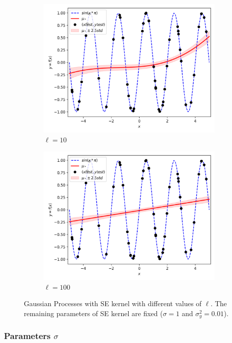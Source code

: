 \documentclass{article}
\begin{document}
\begin{figure}[h]
\begin{subfigure}{.33\textwidth}
    \includegraphics[width=\linewidth]{kernelSE/ell/10.png}
    \caption{$\ell = 10$}
    \label{fig:ell10}
  \end{subfigure}
  \begin{subfigure}{.33\textwidth}
    \centering
    \includegraphics[width=\linewidth]{kernelSE/ell/100.png}
    \caption{$\ell = 100$}
    \label{fig:ell100}
  \end{subfigure}
  \caption{Gaussian Processes with SE kernel with different values of $\ell$. The remaining parameters of SE kernel are fixed ($\sigma = 1$ and $\sigma_y^2 = 0.01$).}
  \label{fig:ell}
\end{figure}

\subsubsection{Parameters $\sigma$}
\end{document}
